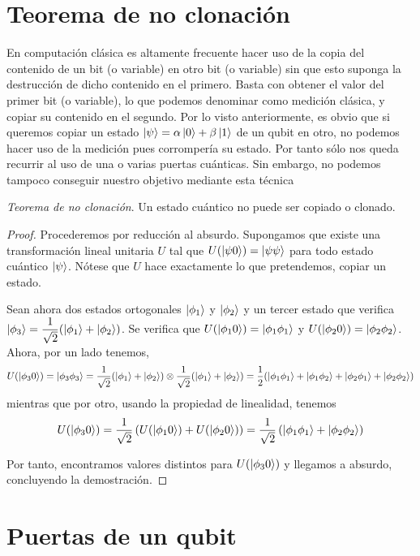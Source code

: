\section{Teorema de no clonación}
En computación clásica es altamente frecuente hacer uso de la copia del contenido de un bit (o variable) en otro bit (o variable) sin que esto suponga la destrucción de dicho contenido en el primero. Basta con obtener el valor del primer bit (o variable), lo que podemos denominar como medición clásica, y copiar su contenido en el segundo. Por lo visto anteriormente, es obvio que si queremos copiar un estado $\left|\psi\right\rangle=\alpha\left|0\right\rangle+\beta\left|1\right\rangle$ de un qubit en otro, no podemos hacer uso de la medición pues corrompería su estado. Por tanto sólo nos queda recurrir al uso de una o varias puertas cuánticas. Sin embargo, no podemos tampoco conseguir nuestro objetivo mediante esta técnica

\begin{thm} \textit{Teorema de no clonación}. Un estado cuántico no puede ser copiado o clonado.
\begin{proof}
Procederemos por reducción al absurdo. Supongamos que existe una transformación lineal unitaria $U$ tal que $U(\left|\psi0\right\rangle)=\left|\psi\psi\right\rangle$ para todo estado cuántico $\left|\psi\right\rangle$. Nótese que $U$ hace exactamente lo que pretendemos, copiar un estado.

Sean ahora dos estados ortogonales $\left|\phi_1\right\rangle$ y $\left|\phi_2\right\rangle$ y un tercer estado que verifica $\left|\phi_3\right\rangle=\dfrac{1}{\sqrt{2}}(\left|\phi_1\right\rangle+\left|\phi_2\right\rangle)$. Se verifica que $U(\left|\phi_10\right\rangle)=\left|\phi_1\phi_1\right\rangle$ y $U(\left|\phi_20\right\rangle)=\left|\phi_2\phi_2\right\rangle$. Ahora, por un lado tenemos,
\[U(\left|\phi_30\right\rangle)=\left|\phi_3\phi_3\right\rangle=\dfrac{1}{\sqrt{2}}(\left|\phi_1\right\rangle+\left|\phi_2\right\rangle)\otimes\dfrac{1}{\sqrt{2}}(\left|\phi_1\right\rangle+\left|\phi_2\right\rangle)=\dfrac{1}{2}(\left|\phi_1\phi_1\right\rangle+\left|\phi_1\phi_2\right\rangle+\left|\phi_2\phi_1\right\rangle+\left|\phi_2\phi_2\right\rangle)\]
%
mientras que por otro, usando la propiedad de linealidad, tenemos
\[U(\left|\phi_30\right\rangle)=\dfrac{1}{\sqrt{2}}\left(U(\left|\phi_10\right\rangle)+U(\left|\phi_20\right\rangle)\right)=\dfrac{1}{\sqrt{2}}\left(\left|\phi_1\phi_1\right\rangle+\left|\phi_2\phi_2\right\rangle\right)\]

Por tanto, encontramos valores distintos para $U(\left|\phi_30\right\rangle)$ y llegamos a absurdo, concluyendo la demostración.
\end{proof}
\end{thm}

\section{Puertas de un qubit}

